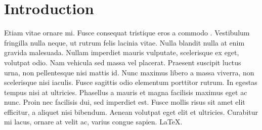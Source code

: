 \section{Introduction}
Etiam vitae ornare mi. Fusce consequat tristique eros a commodo \cite{c8}. Vestibulum fringilla nulla neque, ut rutrum felis lacinia vitae. Nulla blandit nulla at enim gravida malesuada. Nullam imperdiet mauris vulputate, scelerisque ex eget, volutpat odio. Nam vehicula sed massa vel placerat. Praesent suscipit luctus urna, non pellentesque nisi mattis id. Nunc maximus libero a massa viverra, non scelerisque nisi iaculis. Fusce sagittis odio elementum porttitor rutrum. In egestas tempus nisi at ultricies. Phasellus a mauris et magna facilisis maximus eget ac nunc. Proin nec facilisis dui, sed imperdiet est. Fusce mollis risus sit amet elit efficitur, a aliquet nisi bibendum. Aenean volutpat eget elit et ultricies. Curabitur mi lacus, ornare at velit ac, varius congue sapien. \LaTeX.
